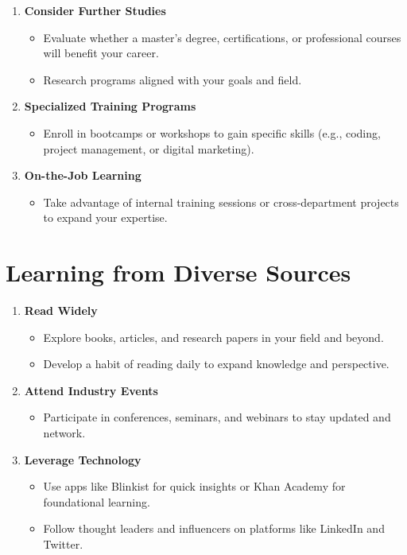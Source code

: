 \documentclass[
  letterpaper,
  DIV=11,
  numbers=noendperiod]{scrreprt}
\providecommand{\tightlist}{%
  \setlength{\itemsep}{0pt}\setlength{\parskip}{0pt}}\usepackage{longtable,booktabs,array}
\begin{document}
\begin{enumerate}
\def\labelenumi{\arabic{enumi}.}
\item
  \textbf{Consider Further Studies}

  \begin{itemize}
  \tightlist
  \item
    Evaluate whether a master's degree, certifications, or professional
    courses will benefit your career.
  \item
    Research programs aligned with your goals and field.
  \end{itemize}
\item
  \textbf{Specialized Training Programs}

  \begin{itemize}
  \tightlist
  \item
    Enroll in bootcamps or workshops to gain specific skills (e.g.,
    coding, project management, or digital marketing).
  \end{itemize}
\item
  \textbf{On-the-Job Learning}

  \begin{itemize}
  \tightlist
  \item
    Take advantage of internal training sessions or cross-department
    projects to expand your expertise.
  \end{itemize}
\end{enumerate}

\section{Learning from Diverse
Sources}\label{learning-from-diverse-sources}

\begin{enumerate}
\def\labelenumi{\arabic{enumi}.}
\item
  \textbf{Read Widely}

  \begin{itemize}
  \tightlist
  \item
    Explore books, articles, and research papers in your field and
    beyond.
  \item
    Develop a habit of reading daily to expand knowledge and
    perspective.
  \end{itemize}
\item
  \textbf{Attend Industry Events}

  \begin{itemize}
  \tightlist
  \item
    Participate in conferences, seminars, and webinars to stay updated
    and network.
  \end{itemize}
\item
  \textbf{Leverage Technology}

  \begin{itemize}
  \tightlist
  \item
    Use apps like Blinkist for quick insights or Khan Academy for
    foundational learning.
  \item
    Follow thought leaders and influencers on platforms like LinkedIn
    and Twitter.
  \end{itemize}
\end{enumerate}
\end{document}
